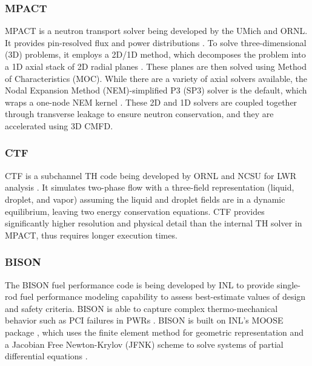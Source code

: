 \documentclass[edeposit,fullpage,12pt]{uiucthesis2009}
\begin{document}
\subsubsection{MPACT}
MPACT is a neutron transport solver being developed by the \gls{UMich} and \gls{ORNL}. 
It provides pin-resolved flux and power distributions \cite{kochunas_overview_2013}. 
To solve three-dimensional (3D) problems, it employs a 2D/1D method, which decomposes the problem into a 1D axial stack of 2D radial planes \cite{zhu_assessment_2014}. 
These planes are then solved using Method of Characteristics (MOC). 
While there are a variety of axial solvers available, the Nodal Expansion Method (NEM)-simplified P3 (SP3) solver is the default, which wraps a one-node NEM kernel \cite{stimpson_axial_2014}. 
These 2D and 1D solvers are coupled together through transverse leakage to ensure neutron conservation, and they are accelerated using 3D \gls{CMFD}. 

\subsubsection{CTF}
CTF is a subchannel TH code being developed by \gls{ORNL} and \gls{NCSU} for LWR analysis \cite{avramova_ctf:_2009}. 
It simulates two-phase flow with a three-field representation (liquid, droplet, and vapor) assuming the liquid and droplet fields are in a dynamic equilibrium, leaving two energy conservation equations. 
CTF provides significantly higher resolution and physical detail than the internal TH solver in MPACT, thus requires longer execution times. 

\subsubsection{BISON}
The BISON fuel performance code is being developed by \gls{INL} to provide single-rod fuel performance modeling capability to assess best-estimate values of design and safety criteria. 
BISON is able to capture complex thermo-mechanical behavior such as PCI failures in PWRs \cite{montgomery_advanced_2014}. 
BISON is built on \gls{INL}'s \gls{MOOSE} package \cite{gaston_moose:_2009}, which uses the finite element method for geometric representation and a Jacobian Free Newton-Krylov (JFNK) scheme to solve systems of partial differential equations \cite{williamson_multidimensional_2012}. 
\end{document}
